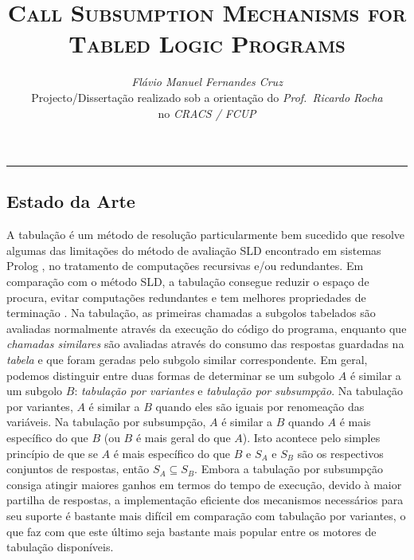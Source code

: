 \documentclass[9pt,a4paper]{extarticle}
\begin{document}
\title{\vspace*{-8mm}\textbf{\textsc{Call Subsumption Mechanisms for Tabled Logic Programs}}}
\author{\emph{Flávio Manuel Fernandes Cruz}\\[2mm]
\small{Projecto/Dissertação realizado sob a orientação do \emph{Prof.\ Ricardo Rocha}}\\
\small{no \emph{CRACS / FCUP}}}
\date{}
\maketitle
\thispagestyle{empty}

\vspace*{-4mm}\noindent\rule{\textwidth}{0.4pt}\vspace*{4mm}

\begin{multicols}{2}

\section{Estado da Arte}

A tabulação é um método de resolução particularmente bem sucedido que resolve algumas das limitações
do método de avaliação SLD encontrado em sistemas Prolog \cite{Chen-96}, no tratamento de computações recursivas e/ou redundantes. Em comparação com o método SLD, a tabulação consegue reduzir o espaço de procura, evitar computações
redundantes e tem melhores propriedades de terminação \cite{Tamaki-86}.
Na tabulação, as primeiras chamadas a subgolos tabelados são avaliadas normalmente através da execução do código do
programa, enquanto que \emph{chamadas similares} são avaliadas através do consumo das respostas guardadas
na \emph{tabela} e que foram geradas pelo subgolo similar correspondente.
Em geral, podemos distinguir entre duas formas de determinar se um subgolo $A$ é similar a um subgolo $B$:
\emph{tabulação por variantes} e \emph{tabulação por subsumpção}.
Na tabulação por variantes, $A$ é similar a $B$ quando eles são iguais por renomeação das variáveis.
Na tabulação por subsumpção, $A$ é similar a $B$ quando $A$ é mais específico do que $B$ (ou $B$ é mais geral do que $A$).
Isto acontece pelo simples princípio de que se $A$ é mais específico do que $B$ e $S_A$ e $S_B$ são os respectivos
conjuntos de respostas, então $S_A \subseteq S_B$.
Embora a tabulação por subsumpção consiga atingir maiores ganhos em termos do tempo de execução, devido
à maior partilha de respostas, a implementação eficiente dos mecanismos necessários para seu suporte é bastante
mais difícil em comparação com tabulação por variantes, o que faz com que este último seja bastante mais popular
entre os motores de tabulação disponíveis.


\end{multicols}
\end{document}
